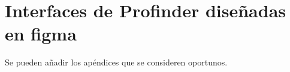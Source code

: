 \chapter{Interfaces de Profinder diseñadas en figma}
\label{Appendix:interfacesfigma}

Se pueden añadir los apéndices que se consideren oportunos.